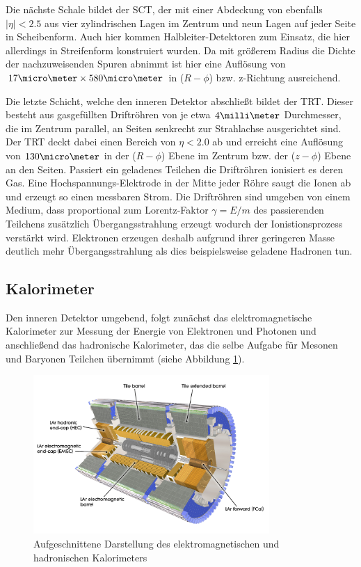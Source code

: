 Die nächste Schale bildet der \acf{SCT}, der mit einer Abdeckung von ebenfalls
$|\eta| < 2.5$ aus vier zylindrischen Lagen im Zentrum und neun Lagen auf jeder
Seite in Scheibenform. Auch hier kommen Halbleiter-Detektoren zum Einsatz, die
hier allerdings in Streifenform konstruiert wurden. Da mit größerem Radius die
Dichte der nachzuweisenden Spuren abnimmt ist hier eine Auflösung von
$17\micro\meter \times 580\micro\meter$ in ($R-\phi$) bzw. z-Richtung
ausreichend.

Die letzte Schicht, welche den inneren Detektor abschließt bildet der
\acf{TRT}.  Dieser besteht aus gasgefüllten Driftröhren von je etwa
$4\milli\meter$ Durchmesser, die im Zentrum parallel, an Seiten senkrecht zur
Strahlachse ausgerichtet sind. Der \ac{TRT} deckt dabei einen Bereich von
$\eta<2.0$ ab und erreicht eine Auflösung von $130\micro\meter$ in der
($R-\phi$) Ebene im Zentrum bzw. der ($z-\phi$) Ebene an den Seiten. Passiert
ein geladenes Teilchen die Driftröhren ionisiert es deren Gas. Eine
Hochspannungs-Elektrode in der Mitte jeder Röhre saugt die Ionen ab und erzeugt
so einen messbaren Strom. Die Driftröhren sind umgeben von einem Medium, dass
proportional zum Lorentz-Faktor $\gamma=E/m$ des passierenden Teilchens
zusätzlich Übergangsstrahlung erzeugt wodurch der Ionistionsprozess verstärkt
wird. Elektronen erzeugen deshalb aufgrund ihrer geringeren Masse deutlich mehr
Übergangsstrahlung als dies beispielsweise geladene Hadronen tun.



\subsection{Kalorimeter}
\label{calorimeter}

Den inneren Detektor umgebend, folgt zunächst das elektromagnetische
Kalorimeter zur Messung der Energie von Elektronen und Photonen und
anschließend das hadronische Kalorimeter, das die selbe Aufgabe für Mesonen und
Baryonen Teilchen übernimmt (siehe Abbildung \ref{fig:calorimeter}).

\begin{figure}
    \centering
    \includegraphics[width=0.8\textwidth]{img/calorimeter}
    \caption[Darstellung der Kalorimeter]
        {Aufgeschnittene Darstellung des elektromagnetischen und hadronischen
        Kalorimeters}
    \label{fig:calorimeter}
\end{figure}


